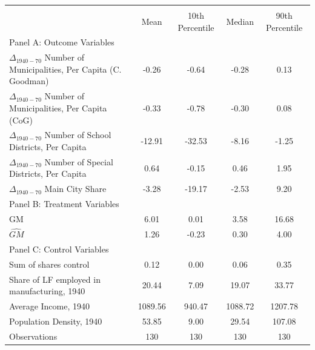  \begin{tabular}{l*{4}{c}} \toprule
                &\multicolumn{4}{c}{}                   \\
                &     Mean&10th Percentile&   Median&90th Percentile\\
\cmidrule(lr){1-5}
\multicolumn{5}{l}{Panel A: Outcome Variables}\\
\cmidrule(lr){1-5}
$\Delta_{1940-70}$ Number of Municipalities, Per Capita (C. Goodman)&    -0.26&    -0.64&    -0.28&     0.13\\
$\Delta_{1940-70}$ Number of Municipalities, Per Capita (CoG)&    -0.33&    -0.78&    -0.30&     0.08\\
$\Delta_{1940-70}$ Number of School Districts, Per Capita&   -12.91&   -32.53&    -8.16&    -1.25\\
$\Delta_{1940-70}$ Number of Special Districts, Per Capita&     0.64&    -0.15&     0.46&     1.95\\
$\Delta_{1940-70}$ Main City Share&    -3.28&   -19.17&    -2.53&     9.20\\
\cmidrule(lr){1-5}
\multicolumn{5}{l}{Panel B: Treatment Variables}\\
\cmidrule(lr){1-5}
GM              &     6.01&     0.01&     3.58&    16.68\\
$\widehat{GM}$  &     1.26&    -0.23&     0.30&     4.00\\
\cmidrule(lr){1-5}
\multicolumn{5}{l}{Panel C: Control Variables}\\
\cmidrule(lr){1-5}
Sum of shares control&     0.12&     0.00&     0.06&     0.35\\
Share of LF employed in manufacturing, 1940&    20.44&     7.09&    19.07&    33.77\\
Average Income, 1940&  1089.56&   940.47&  1088.72&  1207.78\\
Population Density, 1940&    53.85&     9.00&    29.54&   107.08\\
\midrule Observations    &      130   &      130   &      130   &      130   \\    \bottomrule \end{tabular}
